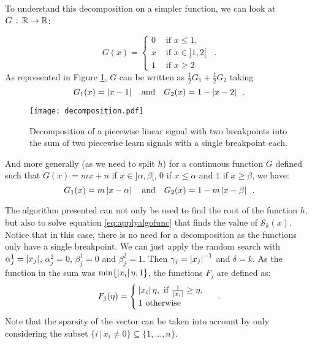 To understand this decomposition on a simpler function, we can look at $G\,:\,\mathbb{R}\rightarrow\mathbb{R}$:

\[G(x)=\begin{cases} 0& \text{ if }x\leq 1,\\
                    x & \text{ if }x\in]1,2[\\
                    1 & \text{ if }x\geq 2\end{cases}\enspace.\]
As represented in Figure \ref{fig:decomposition}, $G$ can be written as $\frac{1}{2}G_1 + \frac{1}{2}G_2$ taking
\[G_1(x)=\left|x-1\right| \quad\text{and}\quad G_2(x)=1-\left|x-2\right|\enspace.\]
\begin{figure}[H]
    \centering
    \texttt{[image: decomposition.pdf]}
    \caption{Decomposition of a piecewise linear signal with two breakpoints into the sum of two piecewise learn signals with a single breakpoint each.}
    \label{fig:decomposition}
\end{figure}

And more generally (as we need to split $h$) for a continuous function $G$ defined such that $G(x)= mx + n$ if $x\in ]\alpha, \beta[$, $0$ if $x\leq \alpha$ and $1$ if $x\geq\beta$, we have:
\[G_1(x)=m\left|x-\alpha\right| \quad\text{and}\quad G_2(x)=1-m\left|x-\beta\right|\enspace.\]

\begin{remark}
The algorithm presented can not only be used to find the root of the function $h$, but also to solve equation \eqref{eq:applyalgofunc} that finds the value of $\mathcal{S}_k(x)$. Notice that in this case, there is no need for a decomposition as the functions only have a single breakpoint. We can just apply the random search with $\alpha_j^1=\left|x_j\right|$, $\alpha_j^2=0$, $\beta_j^1=0$ and $\beta_j^2=1$. Then $\gamma_j=\left|x_j\right|^{-1}$ and $\delta=k$. As the function in the sum was $\min\{\left|x_i\right|\eta,1\}$, the functions $F_j$ are defined as:
\[F_j(\eta)=\begin{cases}\left|x_i\right|\eta,\text{ if }\frac{1}{\left|x_i\right|}\geq \eta, \\ 1 \text{ otherwise}\end{cases}\enspace.\]
Note that the sparsity of the vector can be taken into account by only considering the subset $\{i\,|\, x_i\neq 0\}\subseteq \{1,\dots,n\}.$
\end{remark}

